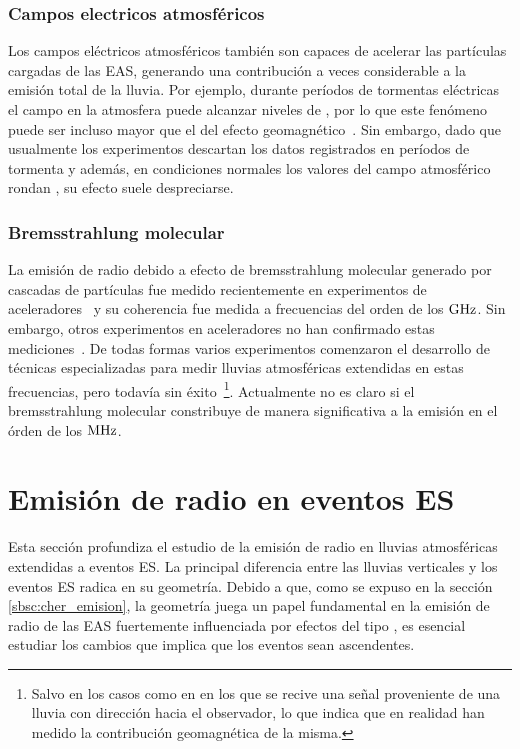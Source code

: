 	\subsubsection{Campos electricos atmosf\'ericos}
	Los campos el\'ectricos atmosf\'ericos tambi\'en son capaces de acelerar las part\'iculas cargadas de las EAS, generando una contribuci\'on a veces considerable a la emisi\'on total de la lluvia. 
	Por ejemplo, durante per\'iodos de tormentas el\'ectricas el campo en la atmosfera puede alcanzar niveles de , por lo que este fen\'omeno puede ser incluso mayor que el del efecto geomagn\'etico~\cite{atmosphericField}.
	Sin embargo, dado que usualmente los experimentos descartan los datos registrados en per\'iodos de tormenta y adem\'as, en condiciones normales los valores del campo atmosf\'erico rondan , su efecto suele despreciarse.
	
	
	\subsubsection{Bremsstrahlung molecular}
	
	La emisi\'on de radio debido a efecto de bremsstrahlung molecular generado por cascadas de part\'iculas fue medido recientemente en experimentos de aceleradores~\cite{bremsstrahlungMolec} y su coherencia fue medida a frecuencias del orden de los $\rm GHz$.
	Sin embargo, otros experimentos en aceleradores no han confirmado estas mediciones~\cite{AMY}.
	De todas formas varios experimentos comenzaron el desarrollo de t\'ecnicas especializadas para medir lluvias atmosf\'ericas extendidas en estas frecuencias, pero todav\'ia sin \'exito~\cite{cite:midas}\footnote{Salvo en los casos como en \cite{cite:CHROME} en los que se recive una se\~nal proveniente de una lluvia con direcci\'on hacia el observador, lo que indica que en realidad han medido la contribuci\'on geomagn\'etica de la misma.}.
	Actualmente no es claro si el bremsstrahlung molecular constribuye de manera significativa a la emisi\'on en el \'orden de los $\rm MHz$.
	
\section{Emisi\'on de radio en eventos ES}
\label{sc:toymodel}
	
	Esta secci\'on profundiza el estudio de la emisi\'on de radio en lluvias atmosf\'ericas extendidas a eventos ES. 
	La principal diferencia entre las lluvias verticales y los eventos ES radica en su geometr\'ia.
	Debido a que, como se expuso en la secci\'on \ref{sbsc:cher_emision}, la geometr\'ia juega un papel fundamental en la emisi\'on de radio de las EAS fuertemente influenciada por efectos del tipo \cher{}, es esencial estudiar los cambios que implica que los eventos sean ascendentes.
	
